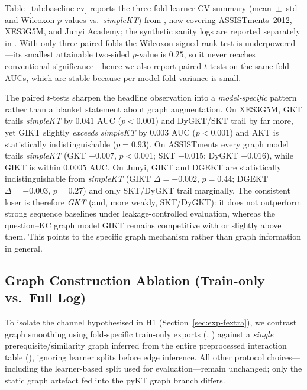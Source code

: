 \documentclass[pdflatex,sn-basic]{sn-jnl}
\begin{document}

Table~\ref{tab:baseline-cv} reports the three-fold learner-CV summary
(mean~$\pm$~std and Wilcoxon $p$-values vs.\ \textit{simpleKT}) from
, now covering ASSISTments~2012,
XES3G5M, and Junyi Academy; the synthetic sanity logs are reported
separately in . With only three
paired folds the Wilcoxon signed-rank test is underpowered---its smallest
attainable two-sided $p$-value is $0.25$, so it never reaches conventional
significance---hence we also report paired $t$-tests on the same fold AUCs,
which are stable because per-model fold variance is small.

The paired $t$-tests sharpen the headline observation into a
\emph{model-specific} pattern rather than a blanket statement about graph
augmentation. On XES3G5M, GKT trails \textit{simpleKT} by $0.041$ AUC
($p{<}0.001$) and DyGKT/SKT trail by far more, yet GIKT slightly
\emph{exceeds} \textit{simpleKT} by $0.003$ AUC ($p{<}0.001$) and AKT is
statistically indistinguishable ($p{=}0.93$). On ASSISTments every graph
model trails \textit{simpleKT} (GKT $-0.007$, $p{<}0.001$; SKT $-0.015$;
DyGKT $-0.016$), while GIKT is within $0.0005$ AUC. On Junyi, GIKT and DGEKT
are statistically indistinguishable from \textit{simpleKT} (GIKT
$\Delta{=}-0.002$, $p{=}0.44$; DGEKT $\Delta{=}-0.003$, $p{=}0.27$) and only
SKT/DyGKT trail marginally. The consistent loser is therefore \emph{GKT}
(and, more weakly, SKT/DyGKT): it does not outperform strong sequence
baselines under leakage-controlled evaluation, whereas the question--KC graph
model GIKT remains competitive with or slightly above them. This points to
the specific graph mechanism rather than graph information in general.

\subsection{Graph Construction Ablation (Train-only vs.\ Full Log)}
\label{sec:exp-graph-ablation}
To isolate the channel hypothesised in H1 (Section~\ref{sec:exp-fextra}),
we contrast graph smoothing using fold-specific train-only exports
(, ) against a
\emph{single} prerequisite/similarity graph inferred from the entire
preprocessed interaction table (),
ignoring learner splits before edge inference.
All other protocol choices---including the learner-based split used for
evaluation---remain unchanged; only the static graph artefact fed into the
pyKT graph branch differs.
\end{document}
